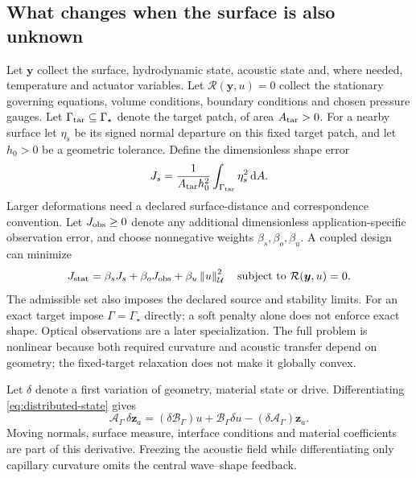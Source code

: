 \subsection{What changes when the surface is also unknown}
Let $\bm y$ collect the surface, hydrodynamic state, acoustic state and, where
needed, temperature and actuator variables. Let
$\mathcal R(\bm y,u)=0$ collect the stationary governing equations,
volume conditions, boundary conditions and chosen pressure gauges.
Let $\Gamma_{\rm tar}\subseteq\Gamma_\star$ denote the target patch, of area
$A_{\rm tar}>0$. For a nearby surface let $\eta_s$ be its signed normal
departure on this fixed target patch, and let $h_0>0$ be a geometric tolerance.
Define the dimensionless shape error
\begin{equation}
 J_s=\frac{1}{A_{\rm tar}h_0^2}\int_{\Gamma_{\rm tar}}\eta_s^2\,\mathrm d A.
 \label{eq:shape-cost}
\end{equation}
Larger deformations need a declared surface-distance and correspondence
convention. Let $J_{\rm obs}\geq0$ denote any additional dimensionless
application-specific observation error, and choose nonnegative weights
$\beta_s,\beta_o,\beta_u$. A coupled design can minimize
\begin{equation}
 J_{\rm stat}=\beta_sJ_s+\beta_oJ_{\rm obs}
                         +\beta_u\left\lVert u\right\rVert_{\mathcal U}^2
 \quad\text{subject to }\mathcal R(\bm y,u)=0.
 \label{eq:coupled-static-design}
\end{equation}
The admissible set also imposes the declared source and stability limits. For
an exact target impose $\Gamma=\Gamma_\star$ directly; a soft penalty alone
does not enforce exact shape. Optical observations are a later specialization.
The full problem is nonlinear
because both required curvature and acoustic transfer depend on geometry;
the fixed-target relaxation does not make it globally convex.

Let $\delta$ denote a first variation of geometry, material state or drive.
Differentiating \cref{eq:distributed-state} gives
\begin{equation}
 \mathcal A_\Gamma\,\delta\bm z_a
   =(\delta\mathcal B_\Gamma)u
       +\mathcal B_\Gamma\delta u
       -(\delta\mathcal A_\Gamma)\bm z_a.
 \label{eq:wave-sensitivity}
\end{equation}
Moving normals, surface measure, interface conditions and material coefficients
are part of this derivative. Freezing the acoustic field while differentiating
only capillary curvature omits the central wave--shape feedback.

